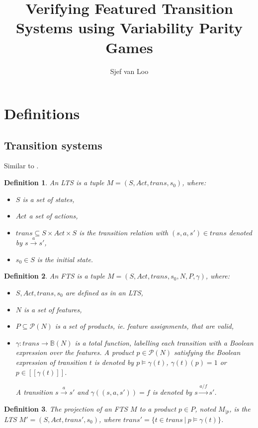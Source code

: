 \documentclass[]{article}
\title{Verifying Featured Transition Systems using Variability Parity Games}
\author{Sjef van Loo}
\newtheorem{definition}{Definition}[section]
\begin{document}
\maketitle

\section{Definitions}
\subsection{Transition systems}
Similar to \cite{Classen2013FeaturedTS}.

\begin{definition}An LTS is a tuple $M = (S, Act, trans, s_0)$, where:
	\begin{itemize}
		\item $S$ is a set of states,
		\item $Act$ a set of actions,
		\item $trans \subseteq S \times Act \times S$ is the transition relation with $(s,a,s') \in trans$ denoted by $s \xrightarrow a s'$,
		\item $s_0 \in S$ is the initial state.
	\end{itemize}
\end{definition}

\begin{definition}An FTS is a tuple $M = (S, Act, trans, s_0, N, P, \gamma)$, where:
	\begin{itemize}
		\item $S, Act, trans, s_0$ are defined as in an LTS,
		\item $N$ is a set of features,
		\item $P \subseteq \mathcal{P}(N)$ is a set of products, ie. feature assignments, that are valid,
		\item $\gamma : trans \rightarrow \mathbb{B}(N)$ is a total function, labelling each transition with a Boolean expression over the features. A product $p \in \mathcal{P}(N)$ satisfying the Boolean expression of transition $t$ is denoted by $p \models \gamma(t)$, $\gamma(t)(p) = 1$ or $p \in [\![\gamma(t)]\!]$. 
		
		A transition $s \xrightarrow a s'$ and $\gamma((s,a,s')) = f$ is denoted by $s \xrightarrow {a / f} s'$. 
	\end{itemize}
\end{definition}

\begin{definition}
	The projection of an FTS $M$ to a product $p \in P$, noted $M_{|p}$, is the LTS $M'=(S,Act,trans', s_0)$, where $trans' = \{t \in trans\ |\ p \models \gamma(t)\}$.
\end{definition}
\end{document}
